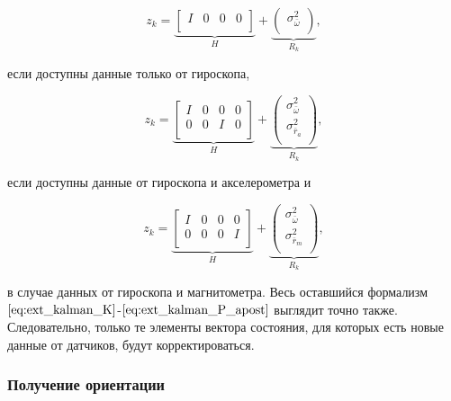 \documentclass[12pt,a4paper]{article}
\begin{document}
\begin{equation*}
	z_k = \underbrace{
		\begin{bmatrix}
			I & 0 & 0 & 0 \\
		\end{bmatrix}
	}_H + \underbrace{
		\begin{pmatrix}
			\sigma_{\bar\omega}^2 \\
		\end{pmatrix}
	}_{R_k},
\end{equation*}	

если доступны данные только от гироскопа, 

\begin{equation*}
	z_k = \underbrace{
		\begin{bmatrix}
			I & 0 & 0 & 0 \\
			0 & 0 & I & 0 \\
		\end{bmatrix}
	}_H + \underbrace{
		\begin{pmatrix}
			\sigma_{\bar\omega}^2 \\
			\sigma_{\bar r_a}^2 \\
		\end{pmatrix}
	}_{R_k},
\end{equation*}	

если доступны данные от гироскопа и акселерометра и

\begin{equation*}
	z_k = \underbrace{
		\begin{bmatrix}
			I & 0 & 0 & 0 \\
			0 & 0 & 0 & I \\
		\end{bmatrix}
	}_H + \underbrace{
		\begin{pmatrix}
			\sigma_{\bar\omega}^2 \\
			\sigma_{\bar r_m}^2 \\
		\end{pmatrix}
	}_{R_k},
\end{equation*}	

в случае данных от гироскопа и магнитометра. Весь оставшийся формализм $\eqref{eq:ext_kalman_K}$-$\eqref{eq:ext_kalman_P_apost}$ выглядит точно также. Следовательно, только те элементы вектора состояния, для которых есть новые данные от датчиков, будут корректироваться.

\subsubsection{Получение ориентации}
\end{document}
